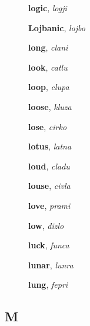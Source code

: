 \documentclass[12pt]{book}
\begin{document}
\begin{description}
\item[ ] \textbf{logic}, \textit{logji}

\item[ ] \textbf{Lojbanic}, \textit{lojbo}

\item[ ] \textbf{long}, \textit{clani}

\item[ ] \textbf{look}, \textit{catlu}

\item[ ] \textbf{loop}, \textit{clupa}

\item[ ] \textbf{loose}, \textit{kluza}

\item[ ] \textbf{lose}, \textit{cirko}

\item[ ] \textbf{lotus}, \textit{latna}

\item[ ] \textbf{loud}, \textit{cladu}

\item[ ] \textbf{louse}, \textit{civla}

\item[ ] \textbf{love}, \textit{prami}

\item[ ] \textbf{low}, \textit{dizlo}

\item[ ] \textbf{luck}, \textit{funca}

\item[ ] \textbf{lunar}, \textit{lunra}

\item[ ] \textbf{lung}, \textit{fepri}



\end{description}



\subsection{M} %
\end{document}

